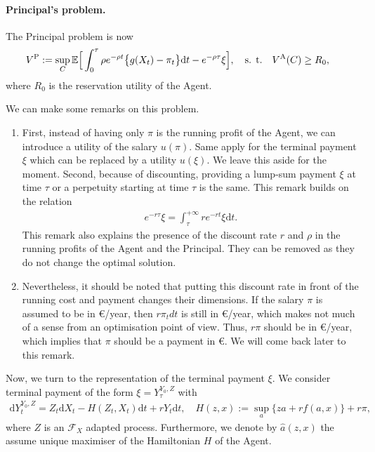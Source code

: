 \documentclass[a4paper,10pt]{article}
\newcommand{\E}{\mathbb{E}}
\newcommand{\dd}{\mathrm{d}}
\theoremstyle{definition}
\theoremstyle{plain}
\numberwithin{equation}{section}
\newcommand{\hs}{\vspace{3mm}}
\begin{document}
\paragraph{Principal's problem.} The Principal problem is now
\begin{align}\label{eq:P}
V^{\rm P} & := \sup_{C} \E\Big[ \int_0^\tau \rho e^{- \rho t}\big\{ g(X_t) - \pi_t \big\} \dd t - e^{-\rho \tau} \xi \Big], \quad
\text{s. t.}  \quad V^{\rm A}(C) \geq R_0,
\end{align}
where $R_0$ is the reservation utility of the Agent.

We can make some remarks on this problem. \begin{enumerate}[\upshape (i)]

\item First, instead of having only $\pi$ is the running profit of the Agent, we can introduce a utility of the salary $u(\pi)$. Same apply for the terminal payment $\xi$ which can be replaced by a utility $u(\xi)$. We leave this aside for the moment. Second, because of discounting, providing a lump-sum payment $\xi$ at time $\tau$ or a perpetuity starting at time $\tau$ is the same. This remark builds on the relation
\begin{align*}
e^{-r \tau} \xi = \int_\tau^{+\infty} r e^{-r t} \xi \dd t.
\end{align*} 
This remark also explains the presence of the discount rate $r$ and $\rho$ in the running profits of the Agent and the Principal. They can be removed as they do not change the optimal solution. 

\item Nevertheless, it should be noted that putting this discount rate in front of the running cost and payment changes their dimensions. If the salary $\pi$ is assumed to be in \euro/year, then $r \pi_t dt$ is still in \euro/year, which makes not much of a sense from an optimisation point of view. Thus, $r \pi$ should be in \euro/year, which implies that $\pi$ should be a payment in \euro. We will come back later to this remark.

\end{enumerate}

\hs

Now, we turn to the representation of the terminal payment $\xi$. We consider terminal payment of the form $\xi = Y_\tau^{Y_0,Z}$ with
\begin{align}
\dd Y_t^{Y_0,Z} =  Z_t \dd X_t - H(Z_t,X_t) \dd t + r Y_t \dd t, \quad H(z,x) := \sup_{a} \big\{ z a + r f(a,x) \big\} + r \pi,
\end{align} 
where $Z$ is an $\mathcal F_{X}$ adapted process. Furthermore, we denote by $\hat{a}(z,x)$ the assume unique maximiser of the Hamiltonian $H$ of the Agent.
\end{document}
